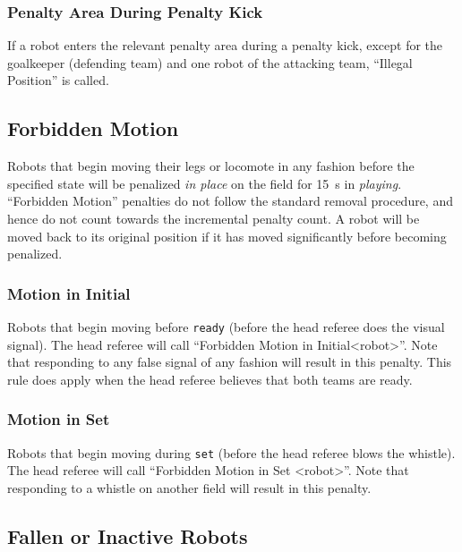 \subsubsection{Penalty Area During Penalty Kick}
\label{sec:ip_penalty_kick}

If a robot enters the relevant penalty area during a penalty kick, except for the goalkeeper (defending team) and one robot of the attacking team, ``Illegal Position'' is called.

\subsection{Forbidden Motion}
Robots that begin moving their legs or locomote in any fashion before the specified state
 will be penalized \textit{in place} on the field for \qty{15}{\second} in \textit{playing}.
``Forbidden Motion'' penalties do not follow the standard removal procedure, and hence do not count towards the incremental penalty count.
A robot will be moved back to its original position if it has moved significantly before becoming penalized.

\subsubsection{Motion in Initial}
\label{sec:motion_in_initial}

Robots that begin moving before \texttt{ready} (\ie before the head referee does the visual signal).
The head referee will call ``Forbidden Motion in Initial\textless robot\textgreater''.
Note that responding to any false signal of any fashion will result in this penalty. This rule does apply when the head referee believes that both teams are ready. 

\subsubsection{Motion in Set}
\label{sec:motion_in_set}

Robots that begin moving during \texttt{set} (\ie before the head referee blows the whistle).
The head referee will call ``Forbidden Motion in Set \textless robot\textgreater''.
Note that responding to a whistle on another field will result in this penalty.

\subsection{Fallen or Inactive Robots}
\label{sec:fallenrobots}


